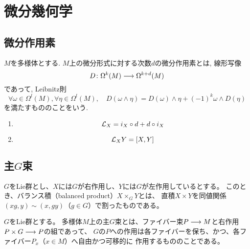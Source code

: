 \section{微分幾何学}

\subsection{微分作用素}
\begin{dfn}
$M$を多様体とする.
$M$上の微分形式に対する次数$d$の微分作用素とは, 線形写像
\begin{equation}
D \colon \Omega^k(M) \longrightarrow \Omega^{k+d}(M)
\end{equation}
であって, Leibnitz則
\begin{equation}
  \forall\omega \in \Omega^l(M), \forall\eta \in \Omega^l(M), \quad
  D(\omega \wedge \eta) = D(\omega)\wedge\eta + (-1)^{k}\omega\wedge D(\eta)
\end{equation}
を満たすもののことをいう.
\end{dfn}

\begin{dfn}[Lie微分]
\end{dfn}

\begin{dfn}[挿入演算子]
\end{dfn}

\begin{thm}
\begin{enumerate}
\item
\begin{equation}
\mathcal{L}_X = i_X \circ d + d \circ i_X
\end{equation}
\item
\begin{equation}
\mathcal{L}_XY = [X, Y]
\end{equation}
\end{enumerate}
\end{thm}

\subsection{主$G$束}

\begin{dfn}
  $G$をLie群とし、$X$には$G$が右作用し、$Y$には$G$が左作用しているとする。
  このとき、バランス積（balanced product）$X\times_G Y$とは、
  直積$X\times Y$を同値関係$(xg,y)\sim(x,gy)$（$g\in G$）で割ったものである。
\end{dfn}

\begin{dfn}
$G$をLie群とする。
多様体$M$上の主$G$束とは、ファイバー束$P\longrightarrow M$と右作用$P\times G\longrightarrow P$の組であって、
$G$の$P$への作用は各ファイバーを保ち、かつ、各ファイバー$P_x$（$x\in M$）へ自由かつ可移的に
作用するもののことである。
\end{dfn}

